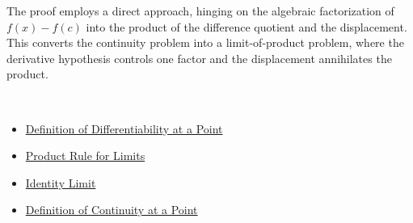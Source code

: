 \begin{remark*}
The proof employs a direct approach, hinging on the algebraic factorization of $f(x) - f(c)$ into the product of the difference quotient and the displacement. This converts the continuity problem into a limit-of-product problem, where the derivative hypothesis controls one factor and the displacement annihilates the product.
\end{remark*}

\begin{remark*}[Dependencies]~\\
\begin{itemize}
  \item \hyperref[def:derivative]{Definition of Differentiability at a Point}
  \item \hyperref[prop:limit-product-rule]{Product Rule for Limits}
  \item \hyperref[prop:identity-limit]{Identity Limit}
  \item \hyperref[def:continuity]{Definition of Continuity at a Point}
\end{itemize}
\end{remark*}
